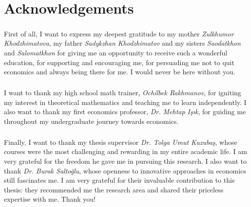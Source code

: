 \chapter*{Acknowledgements}
\vspace{20pt}
  \paragraph*{}First of all, I want to express my deepest gratitude to my mother \textit{Zulkhumor Khodzhimatova}, my father \textit{Sadykzhan Khodzhimatov} and my sisters \textit{Saodatkhon} and \textit{Salomatkhon} for giving me an opportunity to receive such a wonderful education, for supporting and encouraging me, for persuading me not to quit economics and always being there for me. I would never be here without you.
  \paragraph*{}I want to thank my high school math trainer, \textit{Ochilbek Rakhmanov}, for igniting my interest in theoretical mathematics and teaching me to learn independently. I also want to thank my first economics professor, \textit{Dr. Mehtap Işık}, for guiding me throughout my undergraduate journey towards economics.
  \paragraph*{}Finally, I want to thank my thesis supervisor \textit{Dr. Tolga Umut Kuzubaş}, whose courses were the most challenging and rewarding in my entire academic life. I am very grateful for the freedom he gave me in pursuing this research. I also want to thank \textit{Dr. Burak Saltoğlu}, whose openness to innovative approaches in economics still fascinates me. I am very grateful for their invaluable contribution to this thesis: they recommended me the research area and shared their priceless expertise with me. Thank you!
